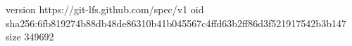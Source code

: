 version https://git-lfs.github.com/spec/v1
oid sha256:6fb819274b88db48de86310b41b045567c4ffd63b2ff86d3f521917542b3b147
size 349692
